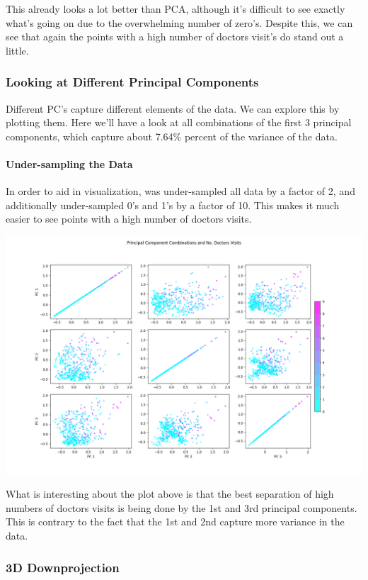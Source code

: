 \documentclass[
]{article}
\begin{document}
This already looks a lot better than PCA, although it's difficult to see
exactly what's going on due to the overwhelming number of zero's.
Despite this, we can see that again the points with a high number of
doctors visit's do stand out a little.

\subsubsection{Looking at Different Principal
Components}\label{looking-at-different-principal-components}

Different PC's capture different elements of the data. We can explore
this by plotting them. Here we'll have a look at all combinations of the
first 3 principal components, which capture about 7.64\% percent of the
variance of the data.

\paragraph{Under-sampling the Data}\label{under-sampling-the-data}

In order to aid in visualization, was under-sampled all data by a factor
of 2, and additionally under-sampled 0's and 1's by a factor of 10. This
makes it much easier to see points with a high number of doctors visits.

\includegraphics{mca_pc_comb.png}

What is interesting about the plot above is that the best separation of
high numbers of doctors visits is being done by the 1st and 3rd
principal components. This is contrary to the fact that the 1st and 2nd
capture more variance in the data.

\subsubsection{3D Downprojection}\label{d-downprojection}
\end{document}
